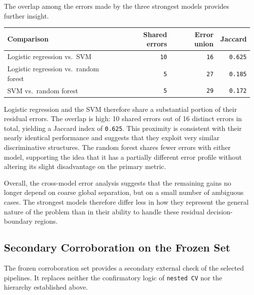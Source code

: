The overlap among the errors made by the three strongest models provides further insight.

\begin{table}[H]
\centering
\begin{tabular}{|l|r|r|r|}
\hline
\textbf{Comparison} & \textbf{Shared errors} & \textbf{Error union} & \textbf{Jaccard} \\
\hline
Logistic regression vs.\ SVM & \texttt{10} & \texttt{16} & \texttt{0.625} \\
Logistic regression vs.\ random forest & \texttt{5} & \texttt{27} & \texttt{0.185} \\
SVM vs.\ random forest & \texttt{5} & \texttt{29} & \texttt{0.172} \\
\hline
\end{tabular}
\end{table}

Logistic regression and the SVM therefore share a substantial portion of their residual errors. The overlap is high: 10 shared errors out of 16 distinct errors in total, yielding a Jaccard index of \texttt{0.625}. This proximity is consistent with their nearly identical performance and suggests that they exploit very similar discriminative structures. The random forest shares fewer errors with either model, supporting the idea that it has a partially different error profile without altering its slight disadvantage on the primary metric.

Overall, the cross-model error analysis suggests that the remaining gains no longer depend on coarse global separation, but on a small number of ambiguous cases. The strongest models therefore differ less in how they represent the general nature of the problem than in their ability to handle these residual decision-boundary regions.

\subsection{Secondary Corroboration on the Frozen Set}
The frozen corroboration set provides a secondary external check of the selected pipelines. It replaces neither the confirmatory logic of \texttt{nested CV} nor the hierarchy established above.

